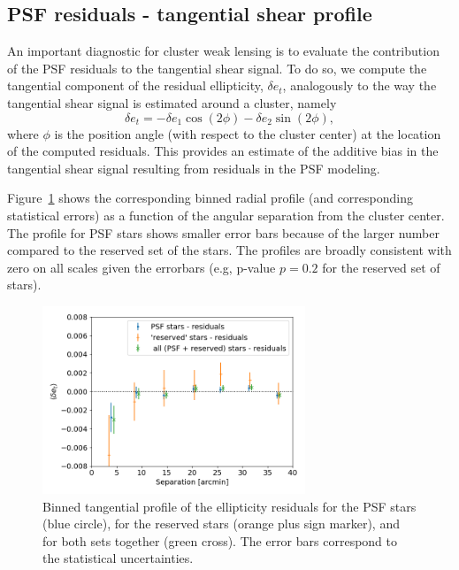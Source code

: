 \documentclass[SE,lsstdraft,authoryear,toc]{lsstdoc}
\begin{document}
\subsection{PSF residuals - tangential shear profile}

An important diagnostic for cluster weak lensing is to evaluate the contribution of the PSF residuals to the tangential shear signal. To do so, we compute the tangential component of the residual ellipticity, $\delta e_t$, analogously to the way the tangential shear signal is estimated around a cluster, namely 
\begin{equation}
\delta e_t = - \delta e_1  \cos(2 \phi) - \delta e_2  \sin(2 \phi),
\end{equation}
where $\phi$ is the position angle (with respect to the cluster center) at the location of the computed residuals. %
 This provides an estimate of the additive bias in the tangential shear signal resulting from residuals in the PSF modeling.

Figure~{\ref{fig:res_profile}} shows the corresponding binned radial profile (and corresponding statistical errors) as a function of the angular separation from the cluster center. The profile for PSF stars shows smaller error bars because of the larger number compared to the reserved set of the stars. The profiles are broadly consistent with zero on all scales given the errorbars (e.g, p-value $p=0.2$ for the reserved set of stars). 

\begin{figure}
\centering
\includegraphics[width=0.7\textwidth]{Figures/residual_tan_profile_CLMM.png}
\caption{Binned tangential profile of the ellipticity residuals for the PSF stars (blue circle), for the reserved stars (orange plus sign marker), and for both sets together (green cross). The error bars correspond to the statistical uncertainties.\label{fig:res_profile}}
\end{figure}
\end{document}
